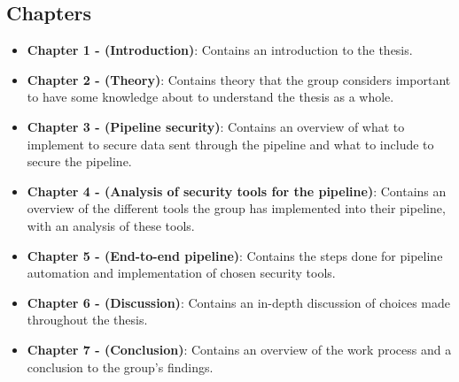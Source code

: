 \subsection{Chapters}
\begin{itemize}
    \item \textbf{Chapter 1 - (Introduction)}: Contains an introduction to the thesis.
    \item \textbf{Chapter 2 - (Theory)}: Contains theory that the group considers important to have some knowledge about to understand the thesis as a whole.
    \item \textbf{Chapter 3 - (Pipeline security)}: Contains an overview of what to implement to secure data sent through the pipeline and what to include to secure the pipeline. 
    \item \textbf{Chapter 4 - (Analysis of security tools for the pipeline)}: Contains an overview of the different tools the group has implemented into their pipeline, with an analysis of these tools.
    \item \textbf{Chapter 5 - (End-to-end pipeline)}: Contains the steps done for pipeline automation and implementation of chosen security tools. 
    \item \textbf{Chapter 6 - (Discussion)}: Contains an in-depth discussion of choices made throughout the thesis. 
    \item \textbf{Chapter 7 - (Conclusion)}: Contains an overview of the work process and a conclusion to the group's findings. 

\end{itemize}






